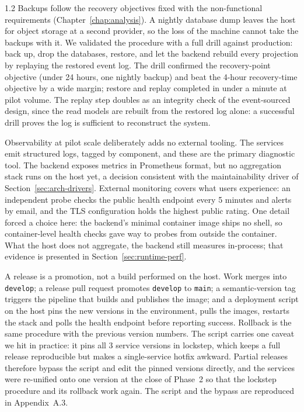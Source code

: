 \begin{spacing}{1.2}
Backups follow the recovery objectives fixed with the non-functional
requirements (Chapter~\ref{chap:analysis}). A nightly database dump
leaves the host for object storage at a second provider, so the loss of
the machine cannot take the backups with it. We validated the procedure
with a full drill against production: back up, drop the databases,
restore, and let the backend rebuild every projection by replaying the
restored event log. The drill confirmed the recovery-point objective
(under 24 hours, one nightly backup) and beat the 4-hour recovery-time
objective by a wide margin; restore and replay completed in under a
minute at pilot volume. The replay step doubles as an integrity check of
the event-sourced design, since the read models are rebuilt from the
restored log alone: a successful drill proves the log is sufficient to
reconstruct the system.

Observability at pilot scale deliberately adds no external tooling. The
services emit structured logs, tagged by component, and these are the
primary diagnostic tool. The backend exposes metrics in Prometheus
format, but no aggregation stack runs on the host yet, a decision
consistent with the maintainability driver of
Section~\ref{sec:arch-drivers}. External monitoring covers what users
experience: an independent probe checks the public health endpoint
every 5 minutes and alerts by email, and the TLS configuration holds
the highest public rating. One detail forced a choice here: the
backend's minimal container image ships no shell, so container-level
health checks gave way to probes from outside the container. What the host does not aggregate, the backend still
measures in-process; that evidence is presented in
Section~\ref{sec:runtime-perf}.

A release is a promotion, not a build performed on the host. Work
merges into \texttt{develop}; a release pull request promotes
\texttt{develop} to \texttt{main}; a semantic-version tag triggers the
pipeline that builds and publishes the image; and a deployment script on
the host pins the new versions in the environment, pulls the images,
restarts the stack and polls the health endpoint before reporting
success. Rollback is the same procedure with the previous version
numbers. The script carries one caveat we hit in practice: it pins all 3
service versions in lockstep, which keeps a full release reproducible
but makes a single-service hotfix awkward. Partial releases therefore
bypass the script and edit the pinned versions directly, and the
services were re-unified onto one version at the close of Phase~2 so
that the lockstep procedure and its rollback work again. The script and
the bypass are reproduced in Appendix~A.3.


\end{spacing}
